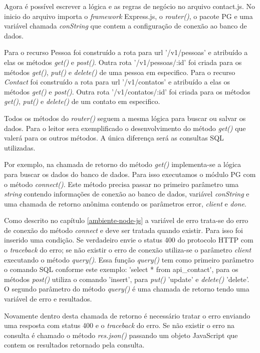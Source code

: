   Agora é possível escrever a lógica e as regras de negócio no arquivo contact.js. No inicio do arquivo importa o \textit{framework}
  Express.js, o \textit{router()}, o pacote PG e uma variável chamada \textit{conString} que contem a configuração de conexão ao banco de dados.
  
  Para o recurso Pessoa foi construído a rota para url '/v1/pessoas' e atribuído a elas os métodos \textit{get()} e \textit{post()}. Outra rota 
  '/v1/pessoas/:id' foi criada para os métodos \textit{get()}, \textit{put()} e \textit{delete()} de uma pessoa em especifico. Para o recurso \textit{Contact} foi 
  construído a rota para url '/v1/contatos' e atribuído a elas os métodos \textit{get()} e \textit{post()}. Outra rota 
  '/v1/contatos/:id' foi criada para os métodos \textit{get()}, \textit{put()} e \textit{delete()} de um contato em especifico.
  
  Todos os métodos do \textit{router()} seguem a mesma lógica para buscar ou salvar os dados. Para o leitor sera exemplificado o desenvolvimento
  do método \textit{get()} que valerá para os outros métodos. A única diferença será as consultas SQL utilizadas. 
  
  Por exemplo, na chamada de retorno do método \textit{get()} implementa-se a lógica para buscar os dados do banco de dados. Para isso executamos 
  o módulo PG com o método \textit{connect()}. Este método precisa passar no primeiro parâmetro uma \textit{string} contendo informações de conexão
  ao banco de dados, variável \textit{conString} e uma chamada de retorno anônima contendo os parâmetros error, \textit{client} e \textit{done}.
  
  Como descrito no capítulo \ref{ambiente-node-js} a variável de erro trata-se do erro de conexão do método \textit{connect} e deve ser 
  tratada quando existir. Para isso foi inserido uma condição. Se verdadeiro envie o status 400 do protocolo HTTP com o 
  \textit{traceback} do erro; se não existir o erro de conexão utiliza-se o parâmetro \textit{client} executando o método \textit{query()}. Essa função \textit{query()}
  tem como primeiro parâmetro o comando SQL conforme este exemplo: \'{}select * from api\_contact\'{}, para os métodos \textit{post()} utiliza o comando
  'insert', para \textit{put()} 'update' e \textit{delete()} 'delete'. O segundo parâmetro do método \textit{query()} é uma chamada de retorno tendo uma 
  variável de erro e resultados.
  
  Novamente dentro desta chamada de retorno é necessário tratar o erro enviando uma resposta com status 400 e o \textit{traceback} do erro.
  Se não existir o erro na consulta é chamado o método \textit{res.json()} passando um objeto JavaScript que contem os resultados retornado
  pela consulta.

